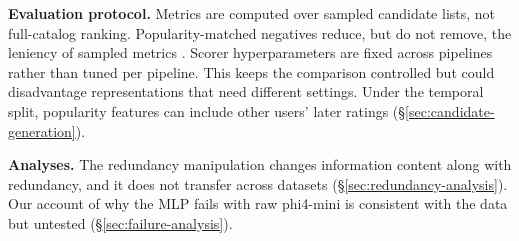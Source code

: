 \textbf{Evaluation protocol.} Metrics are computed over sampled
candidate lists, not full-catalog ranking. Popularity-matched negatives
reduce, but do not remove, the leniency of sampled metrics
\cite{krichene-sampled}. Scorer hyperparameters are fixed across
pipelines rather than tuned per pipeline. This keeps the comparison
controlled but could disadvantage representations that need different
settings. Under the temporal split, popularity features can include
other users' later ratings (\S\ref{sec:candidate-generation}).

\textbf{Analyses.} The redundancy manipulation changes information
content along with redundancy, and it does not transfer across datasets
(\S\ref{sec:redundancy-analysis}). Our account of why the MLP fails
with raw phi4-mini is consistent with the data but untested
(\S\ref{sec:failure-analysis}).
